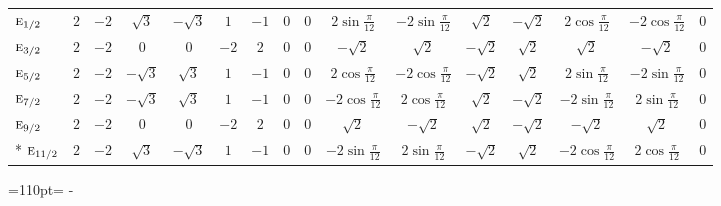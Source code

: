 \documentclass[10pt,a4paper]{article}
\newcommand{\needspace}[1]{\par\penalty-100\begingroup\dimen0=#1\relax\dimen2=\pagegoal
  \advance\dimen2-\pagetotal\ifdim\dimen0>\dimen2\relax\ifdim\dimen2>0pt\vfil\break\fi\fi
  \endgroup}
\numberwithin{equation}{section}
\newcommand{\irr}[1]{\text{\normalfont\scshape #1}}
\begin{document}
{{\begin{longtable}{@{}lccccccccccccccc@{}}
$\irr{e}_{1/2}$ & $2$ & $-2$ & $\sqrt{3}$ & $-\sqrt{3}$ & $1$ & $-1$ & $0$ & $0$ & $2\sin\tfrac{\pi}{12}$ & $-2\sin\tfrac{\pi}{12}$ & $\sqrt{2}$ & $-\sqrt{2}$ & $2\cos\tfrac{\pi}{12}$ & $-2\cos\tfrac{\pi}{12}$ & $0$\\
$\irr{e}_{3/2}$ & $2$ & $-2$ & $0$ & $0$ & $-2$ & $2$ & $0$ & $0$ & $-\sqrt{2}$ & $\sqrt{2}$ & $-\sqrt{2}$ & $\sqrt{2}$ & $\sqrt{2}$ & $-\sqrt{2}$ & $0$\\
$\irr{e}_{5/2}$ & $2$ & $-2$ & $-\sqrt{3}$ & $\sqrt{3}$ & $1$ & $-1$ & $0$ & $0$ & $2\cos\tfrac{\pi}{12}$ & $-2\cos\tfrac{\pi}{12}$ & $-\sqrt{2}$ & $\sqrt{2}$ & $2\sin\tfrac{\pi}{12}$ & $-2\sin\tfrac{\pi}{12}$ & $0$\\
$\irr{e}_{7/2}$ & $2$ & $-2$ & $-\sqrt{3}$ & $\sqrt{3}$ & $1$ & $-1$ & $0$ & $0$ & $-2\cos\tfrac{\pi}{12}$ & $2\cos\tfrac{\pi}{12}$ & $\sqrt{2}$ & $-\sqrt{2}$ & $-2\sin\tfrac{\pi}{12}$ & $2\sin\tfrac{\pi}{12}$ & $0$\\
$\irr{e}_{9/2}$ & $2$ & $-2$ & $0$ & $0$ & $-2$ & $2$ & $0$ & $0$ & $\sqrt{2}$ & $-\sqrt{2}$ & $\sqrt{2}$ & $-\sqrt{2}$ & $-\sqrt{2}$ & $\sqrt{2}$ & $0$\\*
$\irr{e}_{11/2}$ & $2$ & $-2$ & $\sqrt{3}$ & $-\sqrt{3}$ & $1$ & $-1$ & $0$ & $0$ & $-2\sin\tfrac{\pi}{12}$ & $2\sin\tfrac{\pi}{12}$ & $-\sqrt{2}$ & $\sqrt{2}$ & $-2\cos\tfrac{\pi}{12}$ & $2\cos\tfrac{\pi}{12}$ & $0$\\
\bottomrule\end{longtable}}}
\needspace{110pt}
\end{document}
